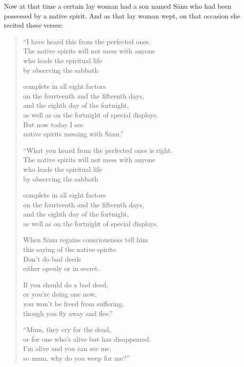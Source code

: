 \documentclass[12pt,openany]{book}%
\begin{document}
Now at that time a certain lay woman had a son named \textsanskrit{Sānu} who had been possessed by a native spirit. And as that lay woman wept, on that occasion she recited these verses: 

\begin{verse}%
“I have heard this from the perfected ones. \\
The native spirits will not mess with anyone \\
who leads the spiritual life \\
by observing the sabbath 

complete in all eight factors \\
on the fourteenth and the fifteenth days, \\
and the eighth day of the fortnight, \\
as well as on the fortnight of special displays. \\
But now today I see \\
native spirits messing with \textsanskrit{Sānu}.” 

“What you heard from the perfected ones is right. \\
The native spirits will not mess with anyone \\
who leads the spiritual life \\
by observing the sabbath 

complete in all eight factors \\
on the fourteenth and the fifteenth days, \\
and the eighth day of the fortnight, \\
as well as on the fortnight of special displays. 

When \textsanskrit{Sānu} regains consciousness tell him \\
this saying of the native spirits: \\
Don’t do bad deeds \\
either openly or in secret. 

If you should do a bad deed, \\
or you’re doing one now, \\
you won’t be freed from suffering, \\
though you fly away and flee.” 

“Mum, they cry for the dead, \\
or for one who’s alive but has disappeared. \\
I’m alive and you can see me, \\
so mum, why do you weep for me?” 


\end{verse}
\end{document}

